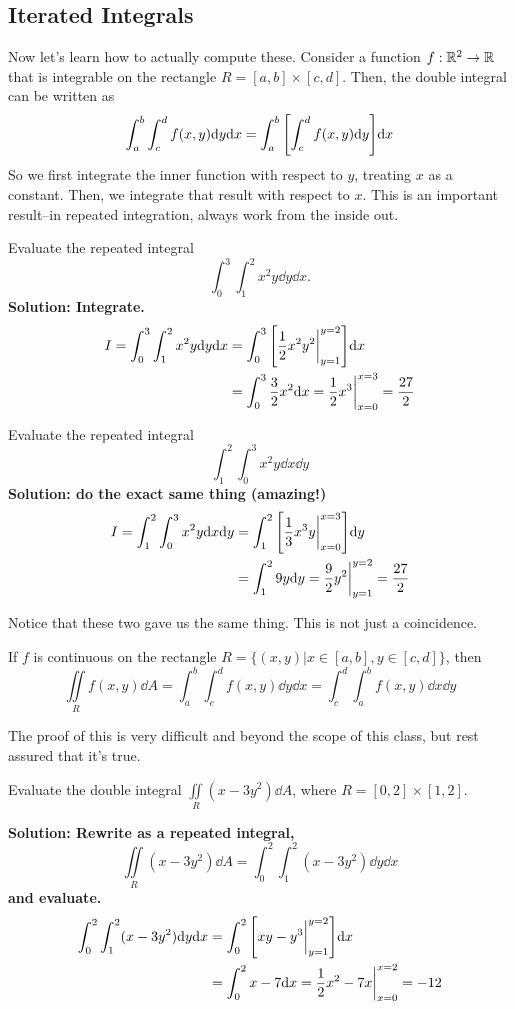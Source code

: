 \subsection{Iterated Integrals}
Now let's learn how to actually compute these. Consider a function \( f: \mathbb{R}^2\to \mathbb{R} \) that is integrable on the rectangle \( R = [a, b]\times[c, d] \). Then, the double integral can be written as 
\[ \int_a^b\int_c^df(x,y)\dd y\dd x = \int_a^b\bqty{\int_c^df(x,y)\dd y}\dd x\]
So we first integrate the inner function with respect to \( y \), treating \( x \) as a constant. Then, we integrate that result with respect to \( x \). This is an important result--in repeated integration, always work from the inside out.
\begin{example}
    Evaluate the repeated integral
    \[ \int_0^3\int_1^2x^2y\dd y\dd x. \]
    \bf{Solution: }Integrate.
    \begin{align*}
        I = \int_0^3\int_1^2x^2y\dd y\dd x &= \int_0^3\bqty{\frac{1}{2}x^2y^2\biggr|_{y=1}^{y=2}}\dd x \\
        &= \int_0^3\frac{3}{2}x^2\dd x = \frac{1}{2}x^3\biggr|_{x=0}^{x=3} = \frac{27}{2}
    \end{align*}
\end{example}
\begin{example}
    Evaluate the repeated integral
    \[ \int_1^2\int_0^3 x^2y\dd x\dd y \]
    \bf{Solution: }do the exact same thing (amazing!)
    \begin{align*}
        I = \int_1^2\int_0^3 x^2y\dd x\dd y &= \int_1^2\bqty{\frac{1}{3}x^3y\biggr|_{x=0}^{x=3}}\dd y \\
        &= \int_1^2 9y\dd y = \frac{9}{2}y^2\biggr|_{y=1}^{y=2} = \frac{27}{2}
    \end{align*}
\end{example}
Notice that these two gave us the same thing. This is not just a coincidence. 
\begin{theorem}
    If \( f \) is continuous on the rectangle \( R = \{(x, y)|x\in[a,b], y\in[c,d]\} \), then
    \[ \iint\limits_Rf(x,y)\dd A = \int_a^b\int_c^df(x,y)\dd y \dd x = \int_c^d\int_a^bf(x,y)\dd x\dd y \]
\end{theorem}
The proof of this is very difficult and beyond the scope of this class, but rest assured that it's true. 
\begin{example}
    Evaluate the double integral \( \iint\limits_R(x-3y^2)\dd A \), where \( R = [0, 2]\times[1, 2] \).\par\bf{Solution: }Rewrite as a repeated integral,
    \[ \iint\limits_R(x-3y^2)\dd A = \int_0^2\int_1^2(x-3y^2)\dd y \dd x\]
    and evaluate.
    \begin{align*}
        \int_0^2\int_1^2(x-3y^2)\dd y \dd x &= \int_0^2\bqty{xy-y^3\biggr|_{y=1}^{y=2}}\dd x \\
        &= \int_0^2 x-7\dd x = \frac{1}{2}x^2-7x\biggr|_{x=0}^{x=2} = -12
    \end{align*}
\end{example}
